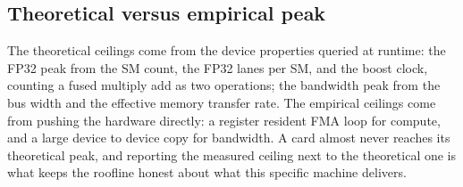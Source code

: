 \subsection{Theoretical versus empirical peak}

The theoretical ceilings come from the device properties queried at runtime:
the FP32 peak from the SM count, the FP32 lanes per SM, and the boost clock,
counting a fused multiply add as two operations; the bandwidth peak from the bus
width and the effective memory transfer rate. The empirical ceilings come from
pushing the hardware directly: a register resident FMA loop for compute, and a
large device to device copy for bandwidth. A card almost never reaches its
theoretical peak, and reporting the measured ceiling next to the theoretical one
is what keeps the roofline honest about what this specific machine delivers.
